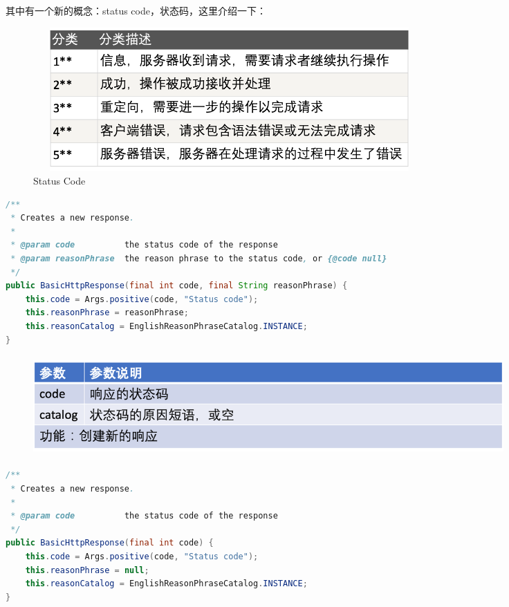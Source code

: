 \documentclass{article}
\begin{document}
	\begin{CJK}{UTF8}{gbsn}
		其中有一个新的概念：status code，状态码，这里介绍一下：
	\end{CJK}{}

	\begin{figure}[H]
		\centering
		\includegraphics[height = 5.5cm, width = 15cm]{pics/24_status_code.png}	
		\caption{Status Code}
	\end{figure}

	\begin{lstlisting}[language={java}]
/**
 * Creates a new response.
 *
 * @param code          the status code of the response
 * @param reasonPhrase  the reason phrase to the status code, or {@code null}
 */
public BasicHttpResponse(final int code, final String reasonPhrase) {
    this.code = Args.positive(code, "Status code");
    this.reasonPhrase = reasonPhrase;
    this.reasonCatalog = EnglishReasonPhraseCatalog.INSTANCE;
}

	\end{lstlisting}

	\begin{figure}[H]
		\centering
		\includegraphics[height = 3.8cm, width = 18cm]{pics/25_Response_table_2.png}	
	\end{figure}

	\begin{lstlisting}[language={java}]
/**
 * Creates a new response.
 *
 * @param code          the status code of the response
 */
public BasicHttpResponse(final int code) {
    this.code = Args.positive(code, "Status code");
    this.reasonPhrase = null;
    this.reasonCatalog = EnglishReasonPhraseCatalog.INSTANCE;
}

	\end{lstlisting}
\end{document}
